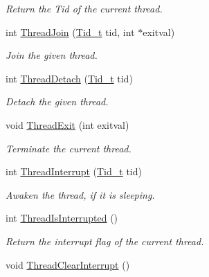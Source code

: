 \begin{DoxyCompactItemize}
\begin{DoxyCompactList}\small\item\em Return the Tid of the current thread. \end{DoxyCompactList}\item 
int \hyperlink{group__syscalls_ga9ffbb344eb33487ceef5442846a74be0}{Thread\-Join} (\hyperlink{group__syscalls_gaf67ad1c55e6b2a79bf8a99106380ce01}{Tid\-\_\-t} tid, int $\ast$exitval)
\begin{DoxyCompactList}\small\item\em Join the given thread. \end{DoxyCompactList}\item 
int \hyperlink{group__syscalls_ga5f957d985678728a418ff70a617fab4d}{Thread\-Detach} (\hyperlink{group__syscalls_gaf67ad1c55e6b2a79bf8a99106380ce01}{Tid\-\_\-t} tid)
\begin{DoxyCompactList}\small\item\em Detach the given thread. \end{DoxyCompactList}\item 
\hypertarget{group__syscalls_gab77e59bf31165db88a22ac8f031b8741}{void \hyperlink{group__syscalls_gab77e59bf31165db88a22ac8f031b8741}{Thread\-Exit} (int exitval)}\label{group__syscalls_gab77e59bf31165db88a22ac8f031b8741}

\begin{DoxyCompactList}\small\item\em Terminate the current thread. \end{DoxyCompactList}\item 
int \hyperlink{group__syscalls_ga5885226a2e93650092c11a68afff7cad}{Thread\-Interrupt} (\hyperlink{group__syscalls_gaf67ad1c55e6b2a79bf8a99106380ce01}{Tid\-\_\-t} tid)
\begin{DoxyCompactList}\small\item\em Awaken the thread, if it is sleeping. \end{DoxyCompactList}\item 
\hypertarget{group__syscalls_ga3475ca7ee0fcf8cd20433760994d9eba}{int \hyperlink{group__syscalls_ga3475ca7ee0fcf8cd20433760994d9eba}{Thread\-Is\-Interrupted} ()}\label{group__syscalls_ga3475ca7ee0fcf8cd20433760994d9eba}

\begin{DoxyCompactList}\small\item\em Return the interrupt flag of the current thread. \end{DoxyCompactList}\item 
\hypertarget{group__syscalls_ga32792a765b508f45a00af690fd8fc474}{void \hyperlink{group__syscalls_ga32792a765b508f45a00af690fd8fc474}{Thread\-Clear\-Interrupt} ()}\label{group__syscalls_ga32792a765b508f45a00af690fd8fc474}


\end{DoxyCompactItemize}
